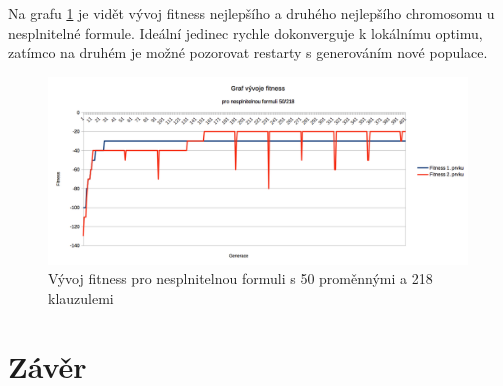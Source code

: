 \documentclass[a4paper]{article}
\begin{document}
	Na grafu \ref{graf-nesplnitelna} je vidět vývoj fitness nejlepšího a druhého nejlepšího chromosomu u nesplnitelné formule. Ideální jedinec rychle dokonverguje k lokálnímu optimu, zatímco na druhém je možné pozorovat restarty s generováním nové populace.
	
	\begin{figure}[h]\centering
		\includegraphics[width=0.99\textwidth]{graf-vyvoj-nesplnitelna.png} 
		\caption{Vývoj fitness pro nesplnitelnou formuli s 50 proměnnými a 218 klauzulemi}
		\label{graf-nesplnitelna}
	\end{figure}

	
\section{Závěr}
\end{document}

